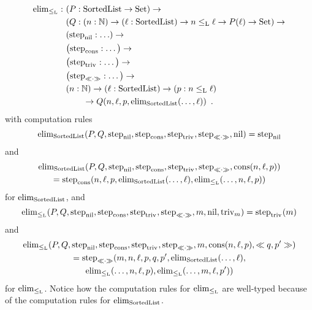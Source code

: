 \documentclass{article}
\begin{document}
\begin{example}
\begin{align*}
  \end{align*}
  \begin{align*}
% 
     \elim_{\lessList} :\ & (P : \SortedList \to \Set) \to \\
                       & (Q : (n : \Nat) \to (\ell : \SortedList) \to n \lessList \ell \to P(\ell) \to \Set) \to \\
                       & (\stepind{\nilList} : \ldots) \to \\
                       & \big(\stepind{\consListbare} : \ldots\big) \to \\
                       & \big(\stepind{\nilLess{}} : \ldots\big) \to \\
                       & \big(\stepind{\consLessbare} : \ldots\big) \to \\
                       & (n : \Nat) \to (\ell : \SortedList) \to (p : n \lessList \ell) \\
                       & \qquad \to Q(n, \ell, p, \elim_{\SortedList}(\ldots, \ell)) \enspace .
  \end{align*}
with computation rules
%
\[
\elim_{\SortedList}(P, Q, \stepind{\nilList}, \stepind{\consListbare}, \stepind{\nilLess{}}, \stepind{\consLessbare}, \nilList) = \stepind{\nilList}
\]
and
\begin{multline*}
\elim_{\SortedList}(P, Q, \stepind{\nilList}, \stepind{\consListbare}, \stepind{\nilLess{}}, \stepind{\consLessbare}, \consList{n}{\ell}{p}) \\
= \stepind{\consListbare}(n, \ell, p, \elim_{\SortedList}(\ldots, \ell), 
\elim_{\lessList}(\ldots, n, \ell, p))  
\end{multline*}
%
for $\elim_{\SortedList}$, and
\[
\elim_{\lessList}(P, Q, \stepind{\nilList}, \stepind{\consListbare}, \stepind{\nilLess{}}, \stepind{\consLessbare}, m, \nilList, \nilLess{m}) = \stepind{\nilLess{}}(m)
\]
and
\begin{multline*}
\elim_{\lessList}(P, Q, \stepind{\nilList}, \stepind{\consListbare}, \stepind{\nilLess{}}, \stepind{\consLessbare}, m, \consList{n}{\ell}{p}, \consLess{m}{n}{\ell}{p}{q}{p'}) \\
= \stepind{\consLessbare}(m, n, \ell, p, q, p', \elim_{\SortedList}(\ldots, \ell), \\
\elim_{\lessList}(\ldots, n, \ell, p), \elim_{\lessList}(\ldots, m, \ell, p'))
\end{multline*}
for $\elim_{\lessList}$. Notice how the computation rules for
$\elim_{\lessList}$ are well-typed because of the computation rules
for $\elim_{\SortedList}$.


\end{example}
\end{document}
